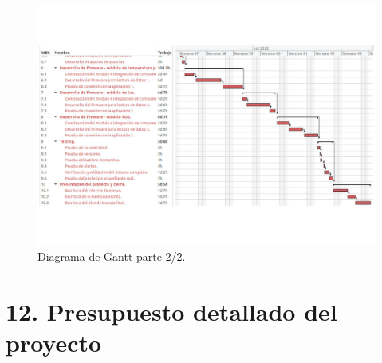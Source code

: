 \documentclass[
11pt, %
]{charter}
\begin{document}
\begin{landscape}
\begin{figure}[htpb]
\centering 
\includegraphics[height=.85\textheight]{./Figuras/DiagramaGantt_2.png}
\caption{Diagrama de Gantt parte 2/2.}
\label{fig:diagGantt}
\end{figure}
\end{landscape}



\section{12. Presupuesto detallado del proyecto}
\label{sec:presupuesto}
\end{document}

